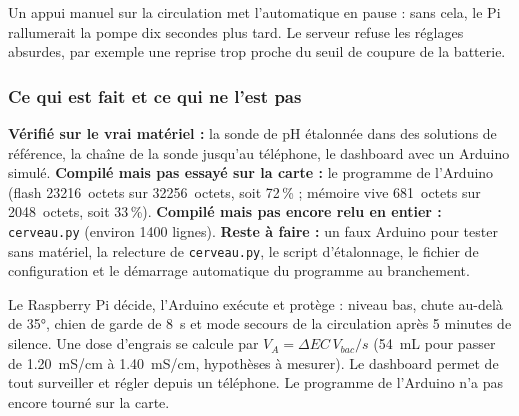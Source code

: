 Un appui manuel sur la circulation met l'automatique en pause : sans cela, le Pi rallumerait la pompe dix secondes plus tard. Le serveur refuse les réglages absurdes, par exemple une reprise trop proche du seuil de coupure de la batterie.

\subsubsection*{Ce qui est fait et ce qui ne l'est pas}

\textbf{Vérifié sur le vrai matériel :} la sonde de pH étalonnée dans des solutions de référence, la chaîne de la sonde jusqu'au téléphone, le dashboard avec un Arduino simulé. \textbf{Compilé mais pas essayé sur la carte :} le programme de l'Arduino (flash \qty{23216}{octets} sur \qty{32256}{octets}, soit 72\,\% ; mémoire vive \qty{681}{octets} sur \qty{2048}{octets}, soit 33\,\%). \textbf{Compilé mais pas encore relu en entier :} \texttt{cerveau.py} (environ 1400 lignes). \textbf{Reste à faire :} un faux Arduino pour tester sans matériel, la relecture de \texttt{cerveau.py}, le script d'étalonnage, le fichier de configuration et le démarrage automatique du programme au branchement.

\begin{aretenir}
Le Raspberry Pi décide, l'Arduino exécute et protège : niveau bas, chute au-delà de \ang{35}, chien de garde de \qty{8}{s} et mode secours de la circulation après 5 minutes de silence. Une dose d'engrais se calcule par $V_A = \Delta EC\,V_{bac}/s$ (\qty{54}{mL} pour passer de \qty{1,20}{mS/cm} à \qty{1,40}{mS/cm}, hypothèses à mesurer). Le dashboard permet de tout surveiller et régler depuis un téléphone. Le programme de l'Arduino n'a pas encore tourné sur la carte.
\end{aretenir}

